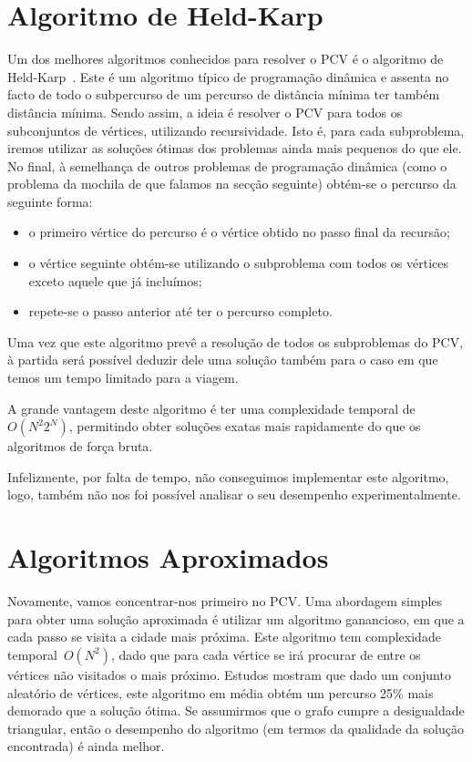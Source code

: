 \documentclass[12pt,a4paper,reqno]{report}
\numberwithin{equation}{section}
\begin{document}
\section{Algoritmo de Held-Karp}

Um dos melhores algoritmos conhecidos para resolver o PCV é o algoritmo de Held-Karp~\cite{Held&Karp:1962}. Este é um algoritmo típico de programação dinâmica e assenta no facto de todo o subpercurso de um percurso de distância mínima ter também distância mínima. Sendo assim, a ideia é resolver o PCV para todos os subconjuntos de vértices, utilizando recursividade. Isto é, para cada subproblema, iremos utilizar as soluções ótimas dos problemas ainda mais pequenos do que ele. No final, à semelhança de outros problemas de programação dinâmica (como o problema da mochila de que falamos na secção seguinte) obtém-se o percurso da seguinte forma:
\begin{itemize}
	\item o primeiro vértice do percurso é o vértice obtido no passo final da recursão;
	\item o vértice seguinte obtém-se utilizando o subproblema com todos os vértices exceto aquele que já incluímos;
	\item repete-se o passo anterior até ter o percurso completo.
\end{itemize}

Uma vez que este algoritmo prevê a resolução de todos os subproblemas do PCV, à partida será possível deduzir dele uma solução também para o caso em que temos um tempo limitado para a viagem.

A grande vantagem deste algoritmo é ter uma complexidade temporal de~$O(N^2 2^N)$, permitindo obter soluções exatas mais rapidamente do que os algoritmos de força bruta.

Infelizmente, por falta de tempo, não conseguimos implementar este algoritmo, logo, também não nos foi possível analisar o seu desempenho experimentalmente.

\section{Algoritmos Aproximados}

Novamente, vamos concentrar-nos primeiro no PCV. Uma abordagem simples para obter uma solução aproximada é utilizar um algoritmo ganancioso, em que a cada passo se visita a cidade mais próxima. Este algoritmo tem complexidade temporal~$O(N^2)$, dado que para cada vértice se irá procurar de entre os vértices não visitados o mais próximo. Estudos mostram que dado um conjunto aleatório de vértices, este algoritmo em média obtém um percurso 25\% mais demorado que a solução ótima. Se assumirmos que o grafo cumpre a desigualdade triangular, então o desempenho do algoritmo (em termos da qualidade da solução encontrada) é ainda melhor.
\end{document}
